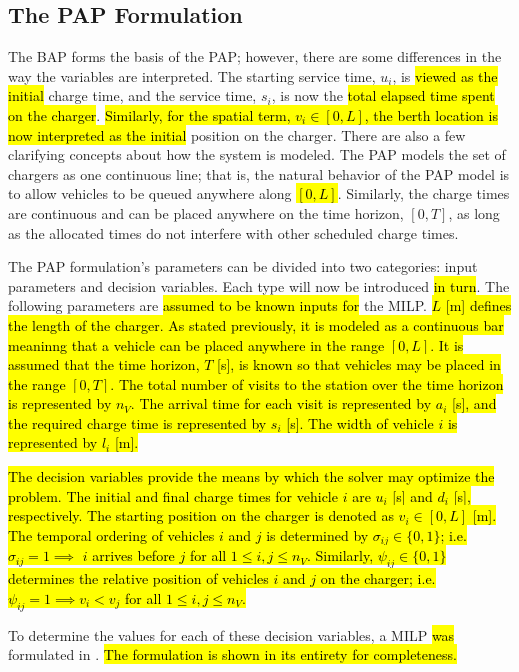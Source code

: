 \documentclass[utf8]{FrontiersinHarvard}
\let\cite\citep                                       %
\begin{document}
\subsection{The PAP Formulation}
\label{sec:the-pap-formulation}
The BAP forms the basis of the PAP; however, there are some differences in the way the variables are interpreted. The
starting service time, \(u_i\), is \hl{viewed as the initial} charge time, and the service time, \(s_i\), is now
the \hl{total elapsed time spent on the charger}. \hl{Similarly, for the spatial term, $v_i \in [0,L]$, the berth location is now interpreted as the initial} position on the charger. There are also a few clarifying
concepts about how the system is modeled. The PAP models the set of chargers as one continuous line; that is, the
natural behavior of the PAP model is to allow vehicles to be queued anywhere along \hl{$[0,L]$}. Similarly, the charge
times are continuous and can be placed anywhere on the time horizon, \([0,T]\), as long as the allocated times do not
interfere with other scheduled charge times.

The PAP formulation's parameters can be divided into two categories: input parameters and decision variables. Each type
will now be introduced \hl{in turn}. The following parameters are \hl{assumed to be known inputs for} the MILP. \hl{$L$ [m] defines the length of the charger. As stated previously, it is modeled as a continuous bar meaninng that a vehicle can be placed anywhere in the range $[0,L]$. It is assumed that the time horizon, $T$ [s], is known so that vehicles may be placed in the range $[0,T]$. The total number of visits to the station over the time horizon is represented by $n_V$. The arrival time for each visit is represented by $a_i$ [s], and the required charge time is represented by $s_i$ [s]. The width of vehicle $i$ is represented by $l_i$ [m].}

\hl{The decision variables provide the means by which the solver may optimize the problem. The initial and final charge times for vehicle $i$ are $u_i$ [s] and $d_i$ [s], respectively. The starting position on the charger is denoted as $v_i \in [0,L]$ [m]. The temporal ordering of vehicles $i$ and $j$ is determined by $\sigma_{ij} \in \{0, 1\}$; i.e. $\sigma_{ij} = 1 \implies$ $i$ arrives before $j$ for all $1 \le i,j \le n_V$. Similarly, $\psi_{ij} \in \{0, 1\}$ determines the relative position of vehicles $i$ and $j$ on the charger; i.e. $\psi_{ij} = 1 \implies v_i < v_j$ for all $1 \le i,j \le n_V$.}

To determine the values for each of these decision variables, a MILP \hl{was} formulated in
\cite{qarebagh-2019-optim-sched}. \hl{The formulation is shown in its entirety for completeness.}
\end{document}
